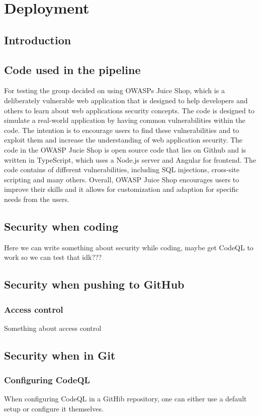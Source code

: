 \chapter{Deployment}
\section{Introduction}
\section{Code used in the pipeline}
For testing the group decided on using OWASPs Juice Shop, which is a deliberately vulnerable web application that is designed to help developers and others to learn about web applications security concepts. The code is designed to simulate a real-world application by having common vulnerabilities within the code. The intention is to encourage users to find these vulnerabilities and to exploit them and increase the understanding of web application security. \cite{owaspJuiceShop}
The code in the OWASP Jucie Shop is open source code that lies on Github and is written in TypeScript, which uses a Node.js server and Angular for frontend. \cite{owaspJuiceShopCode}
The code contains of different vulnerabilities, including SQL injections, cross-site scripting and many others. 
Overall, OWASP Juice Shop encourages users to improve their skills and it allows for customization and adaption for specific needs from the users. 


\section{Security when coding}
Here we can write something about security while coding, maybe get CodeQL to work so we can test that idk???

\section{Security when pushing to GitHub}

\subsection{Access control}
Something about access control

\section{Security when in Git}

\subsection{Configuring CodeQL}
When configuring CodeQL in a GitHib repository, one can either use a default setup or configure it themselves. 

